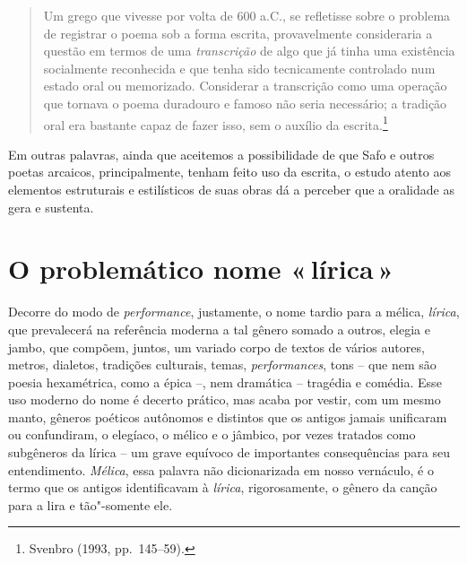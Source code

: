 \begin{quote}
Um grego que vivesse por volta de 600 a.C., se refletisse sobre o problema de
registrar o poema sob a forma escrita, provavelmente consideraria a questão em
termos de uma \textit{transcrição} de algo que já tinha uma existência
socialmente reconhecida e que tenha sido tecnicamente controlado num estado
oral ou memorizado. Considerar a transcrição como uma operação que tornava o
poema duradouro e famoso não seria necessário; a tradição oral era bastante
capaz de fazer isso, sem o auxílio da escrita.\footnote{ Svenbro (1993, pp.~145--59).}
\end{quote}

Em outras palavras, ainda que aceitemos a possibilidade de que Safo e outros
poetas arcaicos, principalmente, tenham feito uso da escrita, o estudo atento
aos elementos estruturais e estilísticos de suas obras dá a perceber que a oralidade as gera e
sustenta.

\section*{O problemático nome «\,lírica\,»}

Decorre do modo de \textit{performance}, justamente, o nome tardio para a mélica,
\textit{lírica}, que prevalecerá na referência moderna a tal gênero somado a outros, elegia e jambo, que compõem, juntos, um variado corpo de
textos de vários autores, metros, dialetos, tradições culturais, temas,
\textit{performances}, tons -- que nem são poesia hexamétrica, como a
épica --, nem dramática -- tragédia e comédia. Esse uso moderno do nome é decerto
prático, mas acaba por vestir, com um mesmo manto,
gêneros poéticos autônomos e distintos que os antigos jamais unificaram ou confundiram, o elegíaco, o mélico e o jâmbico, por vezes tratados como subgêneros da lírica -- um grave equívoco de importantes consequências para seu entendimento. \textit{Mélica}, essa palavra não
dicionarizada em nosso vernáculo, é o termo que os antigos identificavam à
\textit{lírica}, rigorosamente, o gênero da canção para a lira e tão"-somente ele. 

